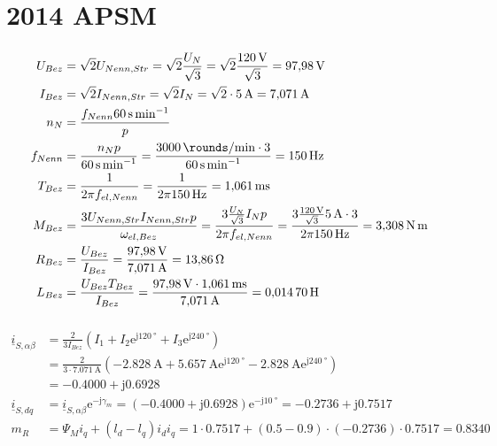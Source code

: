 \documentclass[11pt,a4paper]{scrartcl}
\newcommand{\mybr}[1]{\left(#1\right)}
\renewcommand{\j}{\mathrm{j}}
\renewcommand{\i}{\underline{i}}
\newcommand{\0}{_{\mybr{0}}}
\newcommand{\1}{_{\mybr{1}}}
\newcommand{\2}{_{\mybr{2}}}
\renewcommand{\e}{\mathrm{e}}
\newcommand{\isab}{\i_{S,\alpha\beta}}
\newcommand{\isdq}{\i_{S,dq}}
\begin{document}
\clearpage
\part{2014 APSM}
\section{}
\begin{align}
U_{Bez}&=\sqrt{2}U_{Nenn,Str}=\sqrt{2}\frac{U_N}{\sqrt{3}}=\sqrt{2}\frac{\SI{120}{\volt}}{\sqrt{3}}=\SI{97.98}{\volt}\\
I_{Bez}&=\sqrt{2}I_{Nenn,Str}=\sqrt{2}I_N=\sqrt{2}\cdot\SI{5}{\ampere}=\SI{7.071}{\ampere}\\
n_N&=\frac{f_{Nenn}\SI{60}{\second\per\minute}}{p}\\
f_{Nenn}&=\frac{n_N p}{\SI{60}{\second\per\minute}}=\frac{\SI{3000}{\rounds\per\minute}\cdot 3}{\SI{60}{\second\per\minute}}=\SI{150}{\hertz}\\
T_{Bez}&=\frac{1}{2\pi f_{el,Nenn}}=\frac{1}{2\pi\SI{150}{\hertz}}=\SI{1.061}{\milli\second}\\
M_{Bez}&=\frac{3 U_{Nenn,Str}I_{Nenn,Str}p}{\omega_{el,Bez}}=\frac{3 \frac{U_N}{\sqrt{3}}I_{N}p}{2\pi f_{el,Nenn}}=\frac{3\frac{\SI{120}{\volt}}{\sqrt{3}}\SI{5}{\ampere}\cdot 3}{2\pi\SI{150}{\hertz}}=\SI{3.308}{\newton\metre}\\
R_{Bez}&=\frac{U_{Bez}}{I_{Bez}}=\frac{\SI{97.98}{\volt}}{\SI{7.071}{\ampere}}=\SI{13.86}{\ohm}\\
L_{Bez}&=\frac{U_{Bez}T_{Bez}}{I_{Bez}}=\frac{\SI{97.98}{\volt}\cdot\SI{1.061}{\milli\second}}{\SI{7.071}{\ampere}}=\SI{0.01470}{\henry}
\end{align}

\section{}
\begin{align}
\isab&=\frac{2}{3I_{Bez}}\mybr{I_1+I_2 \e^{\j\SI{120}{\degree}}+I_3\e^{\j\SI{240}{\degree}}}\\
&=\frac{2}{3\cdot\SI{7.071}{\ampere}}\mybr{\SI{-2.828}{\ampere}+\SI{5.657}{\ampere} \e^{\j\SI{120}{\degree}}-\SI{2.828}{\ampere}\e^{\j\SI{240}{\degree}}}\\
&=\num{-0.4000}+\j\num{0.6928}\\
\isdq&=\isab\e^{-\j\gamma_m}=\mybr{\num{-0.4000}+\j\num{0.6928}}\e^{-\j\SI{10}{\degree}}=\num{-0.2736}+\j\num{0.7517}\\
m_R&=\Psi_M i_q +\mybr{l_d-l_q}i_d i_q = \num{1}\cdot\num{0.7517}+\mybr{\num{0.5}-\num{0.9}}\cdot\mybr{\num{-0.2736}}\cdot\num{0.7517}=\num{0.8340}
\end{align}
\end{document}
